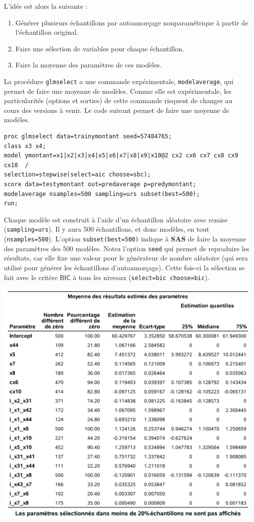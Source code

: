 \documentclass[
  11pt,
  letterpaper,
]{book}
\providecommand{\tightlist}{%
  \setlength{\itemsep}{0pt}\setlength{\parskip}{0pt}}
\theoremstyle{definition}
\theoremstyle{definition}
\theoremstyle{definition}
\theoremstyle{remark}
\begin{document}
L'idée est alors la suivante :

\begin{enumerate}
\def\labelenumi{\arabic{enumi})}
\tightlist
\item
  Générer plusieurs échantillons par autoamorçage nonparamétrique à partir de l`échantillon original.
\item
  Faire une sélection de variables pour chaque échantillon.
\item
  Faire la moyenne des paramètres de ces modèles.
\end{enumerate}

La procédure \texttt{glmselect} a une commande expérimentale, \texttt{modelaverage}, qui permet de faire une moyenne de modèles. Comme elle est expérimentale, les particularités (options et sorties) de cette commande risquent de changer au cours des versions à venir. Le code suivant permet de faire une moyenne de modèles.

\begin{verbatim}
proc glmselect data=trainymontant seed=57484765;
class x3 x4;
model ymontant=x1|x2|x3|x4|x5|x6|x7|x8|x9|x10@2 cx2 cx6 cx7 cx8 cx9 cx10  /   
selection=stepwise(select=aic choose=sbc); 
score data=testymontant out=predaverage p=predymontant;
modelaverage nsamples=500 sampling=urs subset(best=500);
run;
\end{verbatim}

Chaque modèle est construit à l'aide d'un échantillon aléatoire avec remise (\texttt{sampling=urs}). Il y aura 500 échantillons, et donc modèles, en tout (\texttt{nsamples=500}). L'option \texttt{subset(best=500)} indique à \textbf{SAS} de faire la moyenne des paramètres des 500 modèles. Notez l'option \texttt{seed} qui permet de reproduire les résultats, car elle fixe une valeur pour le générateur de nombre aléatoire (qui sera utilisé pour générer les échantillons d'autoamorçage). Cette fois-ci la sélection se fait avec le critère \(\mathsf{BIC}\) à tous les niveaux (\texttt{select=bic\ choose=bic}).

\begin{center}\includegraphics[width=0.9\linewidth]{figures/02-select-e16} \end{center}
\end{document}

